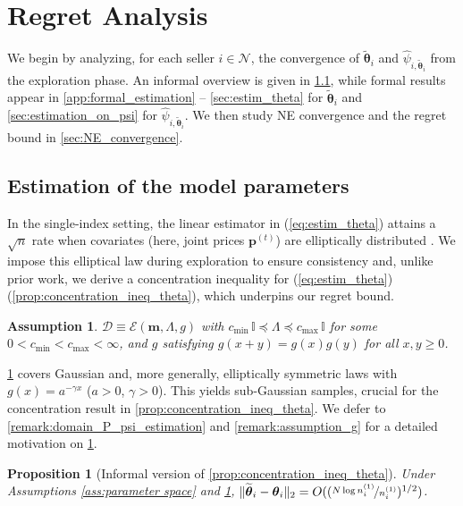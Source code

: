 \documentclass{article} %
\def\eqref#1{equation~\ref{#1}}
\renewcommand{\eqref}[1]{(\ref{#1})}
\newtheorem{assumption}[theorem]{Assumption}
\newtheorem{proposition}[theorem]{Proposition}
\begin{document}
\section{Regret Analysis}

We begin by analyzing, for each seller $i \in \mathcal{N}$, the convergence of $\widetilde{\boldsymbol{\theta}}_i$ and $\widehat{\psi}_{i,\widetilde{\boldsymbol{\theta}}_i}$ from the exploration phase. An informal overview is given in \cref{sec:estimation_model_param}, while formal results appear in \cref{app:formal_estimation} -- \cref{sec:estim_theta} for $\widetilde{\boldsymbol{\theta}}_i$ and \cref{sec:estimation_on_psi} for $\widehat{\psi}_{i,\widetilde{\boldsymbol{\theta}}_i}$. We then study NE convergence and the regret bound in \cref{sec:NE_convergence}.

\subsection{Estimation of the model parameters}\label{sec:estimation_model_param}

In the single-index setting, the linear estimator in \eqref{eq:estim_theta} attains a $\sqrt{n}$ rate when covariates (here, joint prices $\mathbf{p}^{(t)}$) are elliptically distributed \citep{balabdaoui2019least, brillinger2012generalized}. We impose this elliptical law during exploration to ensure consistency and, unlike prior work, we derive a concentration inequality for \eqref{eq:estim_theta} (\cref{prop:concentration_ineq_theta}), which underpins our regret bound.

\begin{assumption}\label{ass:theta_0}
$\mathscr{D} \equiv\mathscr{E}(\mathbf{m},\Lambda,g)$ with $c_{\min}\,\mathbb{I}\preccurlyeq \Lambda \preccurlyeq c_{\max}\,\mathbb{I}$ for some $0<c_{\min}<c_{\max}<\infty$, and $g$ satisfying $g(x+y)=g(x)g(y)$ for all $x,y\ge0$.
\end{assumption}

\cref{ass:theta_0} covers Gaussian and, more generally, elliptically symmetric laws with $g(x)=a^{-\gamma x}$ ($a>0$, $\gamma>0$). This yields sub-Gaussian samples, crucial for the concentration result in \cref{prop:concentration_ineq_theta}. We defer to \cref{remark:domain_P_psi_estimation} and \cref{remark:assumption_g} for a detailed motivation on \cref{ass:theta_0}.

\begin{proposition}[Informal version of \cref{prop:concentration_ineq_theta}]
Under Assumptions \ref{ass:parameter space} and \ref{ass:theta_0}, $\|\widetilde{\boldsymbol{\theta}}_i-\boldsymbol{\theta}_i\|_2 = O((\nicefrac{N\log n_i^{(1)}}{n_i^{(1)}})^{1/2})$.
\end{proposition}
\end{document}
